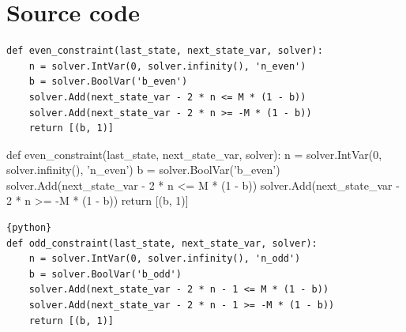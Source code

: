 \section{Source code}

{\small
\begin{verbatim}
def even_constraint(last_state, next_state_var, solver):
    n = solver.IntVar(0, solver.infinity(), 'n_even')
    b = solver.BoolVar('b_even')
    solver.Add(next_state_var - 2 * n <= M * (1 - b))
    solver.Add(next_state_var - 2 * n >= -M * (1 - b))
    return [(b, 1)]
\end{verbatim}
}

\begin{betterpython}
def even_constraint(last_state, next_state_var, solver):
    n = solver.IntVar(0, solver.infinity(), 'n_even')
    b = solver.BoolVar('b_even')
    solver.Add(next_state_var - 2 * n <= M * (1 - b))
    solver.Add(next_state_var - 2 * n >= -M * (1 - b))
    return [(b, 1)]
\end{betterpython}

\begin{lstlisting}{python}
def odd_constraint(last_state, next_state_var, solver):
    n = solver.IntVar(0, solver.infinity(), 'n_odd')
    b = solver.BoolVar('b_odd')
    solver.Add(next_state_var - 2 * n - 1 <= M * (1 - b))
    solver.Add(next_state_var - 2 * n - 1 >= -M * (1 - b))
    return [(b, 1)]
\end{lstlisting}
